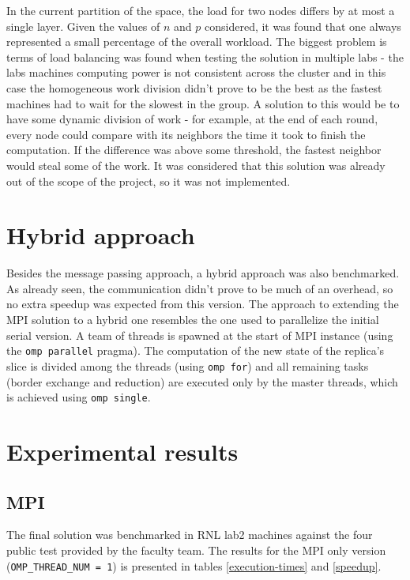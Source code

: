 \documentclass{article}
\begin{document}
In the current partition of the space, the load for two nodes differs by at most
a single layer. Given the values of $n$ and $p$ considered, it was found that
one always represented a small percentage of the overall workload. The biggest
problem is terms of load balancing was found when testing the solution
in multiple labs - the labs machines computing power is not consistent across
the cluster and in this case the homogeneous work division didn't prove to be the best as
the fastest machines had to wait for the slowest in the group. A solution to
this would be to have some dynamic division of work - for example, at the end
of each round, every node could compare with its neighbors the time it took to finish
the computation. If the difference was above some threshold, the fastest
neighbor would steal some of the work. It was considered that this solution was already
out of the scope of the project, so it was not implemented.

\section{Hybrid approach}

Besides the message passing approach, a hybrid approach was also benchmarked.
As already seen, the communication didn't prove to be much of an overhead, so
no extra speedup was expected from this version. The approach to extending the MPI
solution to a hybrid one resembles the one used to parallelize the initial
serial version. A team of threads is spawned at the start of MPI instance (using
the \texttt{omp parallel} pragma). The computation of the new state of the replica's
slice is divided among the threads (using \texttt{omp for}) and all remaining tasks
(border exchange and reduction) are executed only by the master threads, which is
achieved using \texttt{omp single}.

\section{Experimental results}

\subsection{MPI}

The final solution was benchmarked in RNL lab2 machines against the four public
test provided by the faculty team. The results for the MPI only version 
(\texttt{OMP\_THREAD\_NUM = 1}) is presented in tables \ref{execution-times} and
\ref{speedup}.
\end{document}
